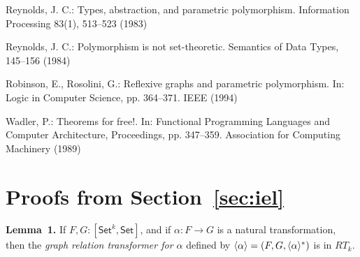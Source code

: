 \documentclass[runningheads]{llncs}
\newcommand{\set}{\mathsf{Set}}
\begin{document}
\begin{thebibliography}{8}
 Reynolds, J. C.: Types, abstraction, and parametric
  polymorphism.  Information Processing 83(1), 513--523 (1983)

 Reynolds, J. C.: Polymorphism is not set-theoretic.
  Semantics of Data Types, 145--156 (1984)

 Robinson, E., Rosolini, G.: Reflexive graphs and
  parametric polymorphism.  In: Logic in Computer Science,
  pp. 364--371. IEEE (1994)

 Wadler, P.: Theorems for free!.  In: Functional
  Programming Languages and Computer Architecture, Proceedings,
  pp. 347--359. Association for Computing Machinery (1989)

\end{thebibliography}


\appendix

\section{Proofs from Section~\ref{sec:iel}}

{\bf Lemma~1.}
If $F,G : [\set^k,\set]$, and if $\alpha : F \to G$ is a natural
transformation, then the {\em graph relation transformer for $\alpha$}
defined by $\langle {\alpha} \rangle = (F, G, \langle {\alpha} \rangle^*)$ is in $RT_k$.
\end{document}
